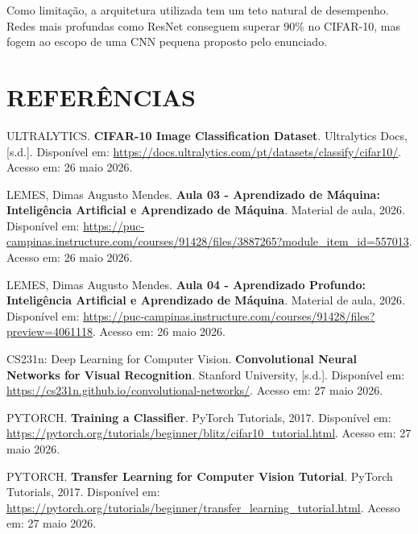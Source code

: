 \documentclass[12pt,a4paper]{article}
\begin{document}
Como limitação, a arquitetura utilizada tem um teto natural de desempenho. Redes mais profundas como ResNet conseguem superar 90\% no CIFAR-10, mas fogem ao escopo de uma CNN pequena proposto pelo enunciado. 

\newpage
\section*{REFERÊNCIAS}

\noindent ULTRALYTICS. \textbf{CIFAR-10 Image Classification Dataset}. Ultralytics Docs, [s.d.]. Disponível em: \url{https://docs.ultralytics.com/pt/datasets/classify/cifar10/}. Acesso em: 26 maio 2026.

\vspace{0.5cm}

\noindent LEMES, Dimas Augusto Mendes. \textbf{Aula 03 - Aprendizado de Máquina: Inteligência Artificial e Aprendizado de Máquina}. Material de aula, 2026. Disponível em: \url{https://puc-campinas.instructure.com/courses/91428/files/3887265?module_item_id=557013}. Acesso em: 26 maio 2026.

\vspace{0.5cm}

\noindent LEMES, Dimas Augusto Mendes. \textbf{Aula 04 - Aprendizado Profundo: Inteligência Artificial e Aprendizado de Máquina}. Material de aula, 2026. Disponível em: \url{https://puc-campinas.instructure.com/courses/91428/files?preview=4061118}. Acesso em: 26 maio 2026.

\vspace{0.5cm}

\noindent CS231n: Deep Learning for Computer Vision. \textbf{Convolutional Neural Networks for Visual Recognition}. Stanford University, [s.d.]. Disponível em: \url{https://cs231n.github.io/convolutional-networks/}. Acesso em: 27 maio 2026.

\vspace{0.5cm}

\noindent PYTORCH. \textbf{Training a Classifier}. PyTorch Tutorials, 2017. Disponível em: \url{https://pytorch.org/tutorials/beginner/blitz/cifar10_tutorial.html}. Acesso em: 27 maio 2026.

\vspace{0.5cm}

\noindent PYTORCH. \textbf{Transfer Learning for Computer Vision Tutorial}. PyTorch Tutorials, 2017. Disponível em: \url{https://pytorch.org/tutorials/beginner/transfer_learning_tutorial.html}. Acesso em: 27 maio 2026.
\end{document}
